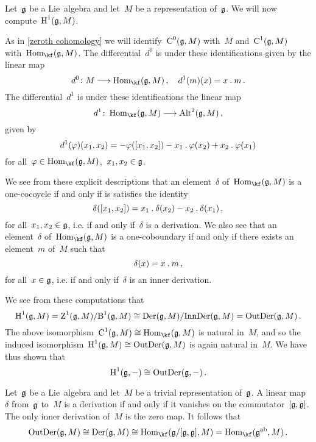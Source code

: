 \begin{fluff}
  Let~$\mathfrak{g}$ be a Lie~algebra and let~$M$ be a representation of~$\mathfrak{g}$.
  We will now compute~$\operatorname{H}^1(\mathfrak{g}, M)$.
  
  As in \cref{zeroth cohomology} we will identify~$\operatorname{C}^0(\mathfrak{g}, M)$ with~$M$ and~$\operatorname{C}^1(\mathfrak{g}, M)$ with~$\Hom_{\kf}(\glie, M)$.
  The differential~$d^0$ is under these identifications given by the linear map
  \[
    d^0
    \colon
    M
    \to
    \Hom_{\kf}(\glie, M) \,,
    \quad
    d^1(m)(x)
    =
    x \act m \,.
  \]
  The differential~$d^1$ is under these identifications the linear map
  \[
    d^1
    \colon
    \Hom_{\kf}(\glie, M)
    \to
    \Alt^2(\glie, M) \,,
  \]
  given by
  \[
    d^1(\varphi)(x_1, x_2)
    =
    - \varphi( [x_1, x_2] )
    - x_1 \mathbin{.} \varphi(x_2)
    + x_2 \mathbin{.} \varphi(x_1)
  \]
  for all~$\varphi \in \Hom_{\kf}(\glie, M)$,~$x_1, x_2 \in \mathfrak{g}$.

  We see from these explicit descriptions that an element~$\delta$ of~$\Hom_{\kf}(\glie, M)$ is a one-cocoycle if and only if is satisfies the identity
  \[
    \delta( [x_1, x_2] )
    =
    x_1 \mathbin{.} \delta(x_2) - x_2 \mathbin{.} \delta(x_1) \,,
  \]
  for all~$x_1, x_2 \in \mathfrak{g}$, i.e. if and only if~$\delta$ is a derivation.
  We also see that an element~$\delta$ of~$\Hom_{\kf}(\glie, M)$ is a one-coboundary if and only if there exists an element~$m$ of~$M$ such that
  \[
    \delta(x)
    =
    x \mathbin{.} m \,,
  \]
  for all~$x \in \mathfrak{g}$, i.e. if and only if~$\delta$ is an inner derivation.
  
  We see from these computations that
  \[
    \operatorname{H}^1(\mathfrak{g}, M)
    =
    \operatorname{Z}^1(\mathfrak{g}, M) / {\operatorname{B}^1(\mathfrak{g}, M)}
    \cong
    \operatorname{Der}(\mathfrak{g}, M) / {\operatorname{InnDer}(\mathfrak{g}, M)}
    =
    \operatorname{OutDer}(\mathfrak{g}, M) \,.
  \]
  The above isomorphism~$\Chain^1(\glie, M) \cong \Hom_{\kf}(\glie, M)$ is natural in~$M$, and so the induced isomorphism~$\operatorname{H}^1(\mathfrak{g}, M) \cong \operatorname{OutDer}(\mathfrak{g}, M)$ is again natural in~$M$.
  We have thus shown that
  \[
    \operatorname{H}^1(\mathfrak{g}, -)
    \cong
    \operatorname{OutDer}(\mathfrak{g}, -) \,.
  \]
\end{fluff}


\begin{example}
  Let~$\mathfrak{g}$ be a Lie~algebra and let~$M$ be a trivial representation of~$\mathfrak{g}$.
  A linear map~$\delta$ from~$\mathfrak{g}$ to~$M$ is a derivation if and only if it vanishes on the commutator~$[\mathfrak{g}, \mathfrak{g}]$.
  The only inner derivation of~$M$ is the zero map.
  It follows that
  \[
    \OutDer(\glie, M)
    \cong
    \Der(\glie, M)
    \cong
    \Hom_{\kf}( \glie / [\glie, \glie], M )
    =
    \Hom_{\kf}( \glie^{\ab},  M ) \,.
  \]
\end{example}



